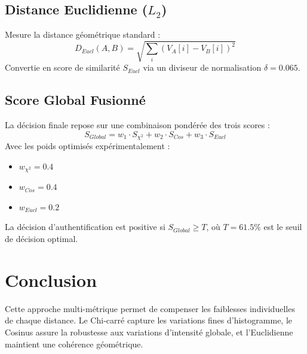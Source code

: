 \documentclass[a4paper,12pt]{article}
\begin{document}
\subsection{Distance Euclidienne ($L_2$)}
Mesure la distance géométrique standard :
\begin{equation}
D_{Eucl}(A, B) = \sqrt{\sum_{i} (V_A[i] - V_B[i])^2}
\end{equation}
Convertie en score de similarité $S_{Eucl}$ via un diviseur de normalisation $\delta = 0.065$.

\subsection{Score Global Fusionné}
La décision finale repose sur une combinaison pondérée des trois scores :
\begin{equation}
S_{Global} = w_1 \cdot S_{\chi^2} + w_2 \cdot S_{Cos} + w_3 \cdot S_{Eucl}
\end{equation}
Avec les poids optimisés expérimentalement :
\begin{itemize}
    \item $w_{\chi^2} = 0.4$
    \item $w_{Cos} = 0.4$
    \item $w_{Eucl} = 0.2$
\end{itemize}

La décision d'authentification est positive si $S_{Global} \ge T$, où $T = 61.5\%$ est le seuil de décision optimal.

\section{Conclusion}
Cette approche multi-métrique permet de compenser les faiblesses individuelles de chaque distance. Le Chi-carré capture les variations fines d'histogramme, le Cosinus assure la robustesse aux variations d'intensité globale, et l'Euclidienne maintient une cohérence géométrique.
\end{document}
